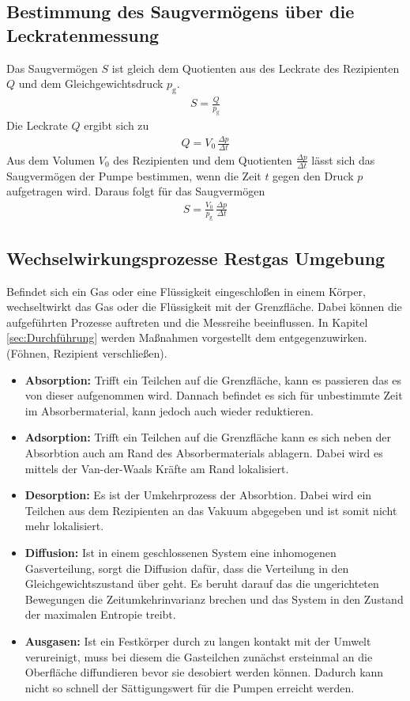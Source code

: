 \subsection{Bestimmung des Saugvermögens über die Leckratenmessung}
Das Saugvermögen $S$ ist gleich dem Quotienten aus des Leckrate des Rezipienten $Q$ und dem Gleichgewichtsdruck $p_\text{g}$.
\begin{align}
   S = \frac{Q}{p_\text{g}}
\end{align}
Die Leckrate $Q$ ergibt sich zu
\begin{align}
   Q = V_0\, \frac{\Delta p}{\Delta t}
\end{align}
Aus dem Volumen $V_0$ des Rezipienten und dem Quotienten $\frac{\Delta p}{\Delta t}$ lässt sich das Saugvermögen der Pumpe bestimmen, wenn die Zeit $t$ gegen den Druck $p$ aufgetragen wird. Daraus folgt für das Saugvermögen
\begin{align}\label{eqn:SaugLeck}
   S = \frac{V_0}{p_\text{g}}\, \frac{\Delta p}{\Delta t}
\end{align}
\subsection{Wechselwirkungsprozesse Restgas Umgebung}
Befindet sich ein Gas oder eine Flüssigkeit eingeschloßen in einem Körper, wechseltwirkt das Gas oder die Flüssigkeit mit der Grenzfläche. Dabei können die aufgeführten Prozesse auftreten und die Messreihe beeinflussen. In Kapitel \ref{sec:Durchführung} werden Maßnahmen vorgestellt dem entgegenzuwirken. (Föhnen, Rezipient verschließen).
\begin{itemize}
  \item \textbf{Absorption:} Trifft ein Teilchen auf die Grenzfläche, kann es passieren das es von dieser aufgenommen wird. Dannach befindet es sich für unbestimmte Zeit im Absorbermaterial, kann jedoch auch wieder reduktieren.
  \item \textbf{Adsorption:} Trifft ein Teilchen auf die Grenzfläche kann es sich neben der Absorbtion auch am Rand des Absorbermaterials ablagern. Dabei wird es mittels der Van-der-Waals Kräfte am Rand lokalisiert.
  \item \textbf{Desorption:} Es ist der Umkehrprozess der Absorbtion. Dabei wird ein Teilchen aus dem Rezipienten an das Vakuum abgegeben und ist somit nicht mehr lokalisiert.
  \item \textbf{Diffusion:} Ist in einem geschlossenen System eine inhomogenen Gasverteilung, sorgt die Diffusion dafür, dass die Verteilung in den Gleichgewichtszustand über geht. Es beruht darauf das die ungerichteten Bewegungen die Zeitumkehrinvarianz brechen und das System in den Zustand der maximalen Entropie treibt.
  \item \textbf{Ausgasen:} Ist ein Festkörper durch zu langen kontakt mit der Umwelt verureinigt, muss bei diesem die Gasteilchen zunächst ersteinmal an die Oberfläche diffundieren bevor sie desobiert werden können. Dadurch kann nicht so schnell der Sättigungswert für die Pumpen erreicht werden.
\end{itemize}
